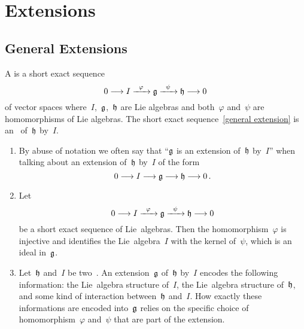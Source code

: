 \chapter{Extensions}








\section{General Extensions}

\begin{definition}
  A  is a short exact sequence
  \begin{equation}
    \label{general extension}
    0 
    \to
    I
    \xto{\varphi}
    \glie
    \xto{\psi}
    \hlie
    \to
    0
  \end{equation}
  of vector spaces where~$I$,~$\mathfrak{g}$,~$\mathfrak{h}$ are Lie algebras and both~$\varphi$ and~$\psi$ are homomorphisms of Lie algebras.
  The short exact sequence~\eqref{general extension} is an~ of~$\mathfrak{h}$ by~$I$.
\end{definition}


\begin{remark}
  \leavevmode
  \begin{enumerate}
    \item
      By abuse of notation we often say that \enquote{$\mathfrak{g}$ is an extension of~$\mathfrak{h}$ by~$I$} when talking about an extension
      of~$\mathfrak{h}$ by~$I$ of the form
      \[
        0 
        \to
        I
        \to
        \glie
        \to
        \hlie
        \to
        0 \,.
      \]
    \item
      Let
      \[
        0
        \to
        I
        \xto{\varphi}
        \glie
        \xto{\psi}
        \hlie
        \to
        0
      \]
      be a short exact sequence of Lie~algebras.
      Then the homomorphism~$\varphi$ is injective and identifies the Lie~algebra~$I$ with the kernel of~$\psi$, which is an ideal in~$\mathfrak{g}$.
    \item
      Let~$\mathfrak{h}$ and~$I$ be two~\liealgebra{$\kf$}.
      An extension~$\mathfrak{g}$ of~$\mathfrak{h}$ by~$I$ encodes the following information:
      the Lie~algebra structure of~$I$, the Lie~algebra structure of~$\mathfrak{h}$, and some kind of interaction between~$\mathfrak{h}$ and~$I$.
      How exactly these informations are encoded into~$\mathfrak{g}$ relies on the specific choice of homomorphism~$\varphi$ and~$\psi$ that are part of the extension.
  \end{enumerate}
\end{remark}


